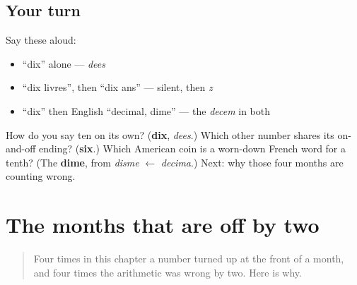 \subsection*{Your turn}
Say these aloud:

\begin{itemize}
\raggedright
  \item \textquotedblleft{}dix\textquotedblright{} alone — \emph{dees}
  \item \textquotedblleft{}dix livres\textquotedblright{}, then \textquotedblleft{}dix ans\textquotedblright{} — silent, then \emph{z}
  \item \textquotedblleft{}dix\textquotedblright{} then English \textquotedblleft{}decimal, dime\textquotedblright{} — the \emph{decem} in both
\end{itemize}

\begin{tcolorbox}[breakable,colback=teal!4,colframe=teal!35!black,title={Before you move on}]
How do you say ten on its own? (\textbf{dix}, \emph{dees}.) Which other number shares its on-and-off ending? (\textbf{six}.) Which American coin is a worn-down French word for a tenth? (The \textbf{dime}, from \emph{disme} $\leftarrow$ \emph{decima}.) Next: why those four months are counting wrong.
\end{tcolorbox}
\section[septembre, octobre, novembre, décembre]{The months that are off by two}

\label{lesson:FR-C06-mois-romains}



\begin{quote}
Four times in this chapter a number turned up at the front of a month, and four times the arithmetic was wrong by two. Here is why.
\end{quote}


